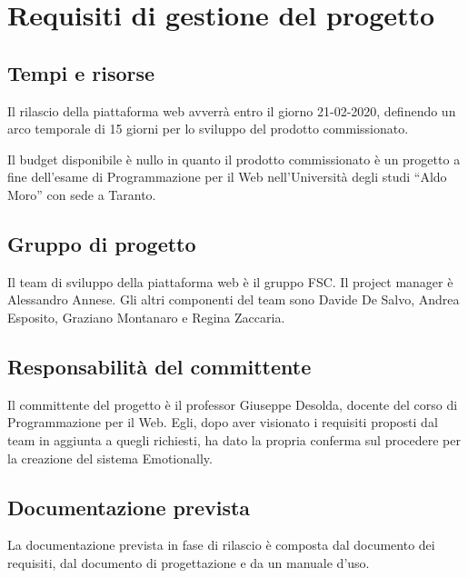 
\chapter{Requisiti di gestione del progetto}
\section{Tempi e risorse}
Il rilascio della piattaforma web avverrà entro il giorno 21-02-2020, definendo 
un arco temporale di 15 giorni per lo sviluppo del prodotto commissionato.

Il budget disponibile è nullo in quanto il prodotto commissionato è un progetto 
a fine dell'esame di Programmazione per il Web nell'Università degli studi 
``Aldo Moro'' con sede a Taranto.

\section{Gruppo di progetto}
Il team di sviluppo della piattaforma web è il gruppo FSC. Il project manager è 
Alessandro Annese. Gli altri componenti del team sono Davide De Salvo, Andrea 
Esposito, Graziano Montanaro e Regina Zaccaria.

\section{Responsabilità del committente}
Il committente del progetto è il professor Giuseppe Desolda, docente del corso 
di Programmazione per il Web. Egli, dopo aver visionato i requisiti proposti 
dal team in aggiunta a quegli richiesti, ha dato la propria conferma sul 
procedere per la creazione del sistema Emotionally.

\section{Documentazione prevista}
La documentazione prevista in fase di rilascio è composta dal documento dei 
requisiti, dal documento di progettazione e da un manuale d'uso.

